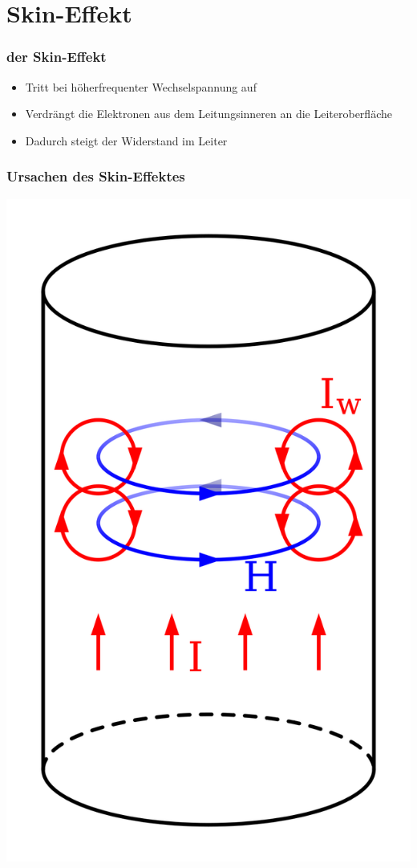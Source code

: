 \section{Skin-Effekt}

\begin{frame}
  \frametitle{der Skin-Effekt}
  \begin{itemize}
    \item Tritt bei höherfrequenter Wechselspannung auf
    \item Verdrängt die Elektronen aus dem Leitungsinneren an die Leiteroberfläche
    \item Dadurch steigt der Widerstand im Leiter
  \end{itemize}
\end{frame}

\begin{frame}
  \frametitle{Ursachen des Skin-Effektes}
  \begin{center}
    \includegraphics[scale=0.06]{a02/Skineffect.png}\\

\end{center}
\end{frame}
